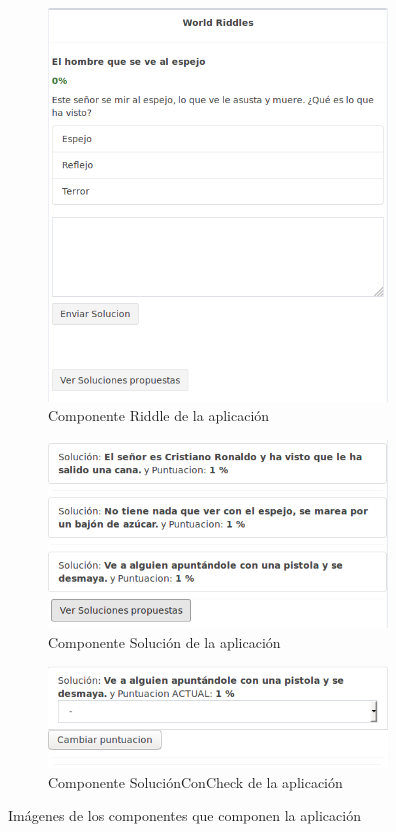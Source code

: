 \begin{figure}[hbtp] \centering \ContinuedFloat
\begin{subfigure}{.6\textwidth}
     \centerline{\includegraphics[width=9cm]{figuras/riddle.png}}
    \caption{Componente Riddle de la aplicación} 
    \label{fig::riddle}
\end{subfigure}
\par\bigskip 
\begin{subfigure}{.6\textwidth}
     \centerline{\includegraphics[width=9cm]{figuras/solucion.png}}
    \caption{Componente Solución de la aplicación} 
    \label{fig::solucionComponent}
\end{subfigure}
\par\bigskip 
\begin{subfigure}{.6\textwidth}
     \centerline{\includegraphics[width=9cm]{figuras/solucionconcheck.png}}
    \caption{Componente SoluciónConCheck de la aplicación} 
    \label{fig::solucionconcheck}
\end{subfigure}
\caption{Imágenes de los componentes que componen la aplicación}
\label{fig::componentes}
\end{figure}


